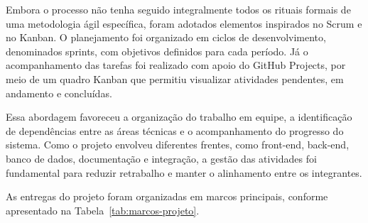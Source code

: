 Embora o processo não tenha seguido integralmente todos os rituais formais de uma metodologia ágil específica, foram adotados elementos inspirados no Scrum e no Kanban. O planejamento foi organizado em ciclos de desenvolvimento, denominados sprints, com objetivos definidos para cada período. Já o acompanhamento das tarefas foi realizado com apoio do GitHub Projects, por meio de um quadro Kanban que permitiu visualizar atividades pendentes, em andamento e concluídas.

Essa abordagem favoreceu a organização do trabalho em equipe, a identificação de dependências entre as áreas técnicas e o acompanhamento do progresso do sistema. Como o projeto envolveu diferentes frentes, como front-end, back-end, banco de dados, documentação e integração, a gestão das atividades foi fundamental para reduzir retrabalho e manter o alinhamento entre os integrantes.

As entregas do projeto foram organizadas em marcos principais, conforme apresentado na Tabela~\ref{tab:marcos-projeto}.

\begin{table}[H]
\centering
\caption{Marcos principais do projeto.}
\label{tab:marcos-projeto}
\end{table}

